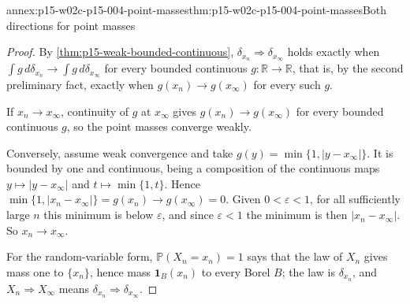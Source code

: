 \begin{annexitem}{annex:p15-w02c-p15-004-point-masses}{thm:p15-w02c-p15-004-point-masses}{Both directions for point masses}
\begin{proof}
By \cref{thm:p15-weak-bounded-continuous}, \(\delta_{x_n}\Rightarrow
\delta_{x_\infty}\) holds exactly when
\(\int g\,d\delta_{x_n}\to\int g\,d\delta_{x_\infty}\) for every
bounded continuous \(g:\mathbb R\to\mathbb R\), that is, by the second
preliminary fact, exactly when \(g(x_n)\to g(x_\infty)\) for every such
\(g\).

If \(x_n\to x_\infty\), continuity of \(g\) at \(x_\infty\) gives
\(g(x_n)\to g(x_\infty)\) for every bounded continuous \(g\), so the
point masses converge weakly.

Conversely, assume weak convergence and take
\(g(y)=\min\{1,|y-x_\infty|\}\). It is bounded by one and continuous,
being a composition of the continuous maps \(y\mapsto|y-x_\infty|\) and
\(t\mapsto\min\{1,t\}\). Hence
\(\min\{1,|x_n-x_\infty|\}=g(x_n)\to g(x_\infty)=0\). Given
\(0<\varepsilon<1\), for all sufficiently large \(n\) this minimum is
below \(\varepsilon\), and since \(\varepsilon<1\) the minimum is then
\(|x_n-x_\infty|\). So \(x_n\to x_\infty\).

For the random-variable form, \(\mathbb P(X_n=x_n)=1\) says that the
law of \(X_n\) gives mass one to \(\{x_n\}\), hence mass
\(\mathbf1_B(x_n)\) to every Borel \(B\); the law is
\(\delta_{x_n}\), and \(X_n\Rightarrow X_\infty\) means
\(\delta_{x_n}\Rightarrow\delta_{x_\infty}\).
\end{proof}
\end{annexitem}

